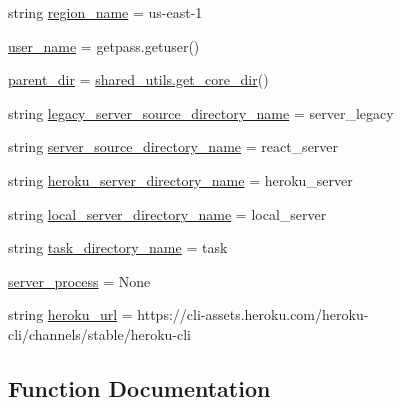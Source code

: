 \begin{DoxyCompactItemize}
\item 
string \hyperlink{namespaceparlai_1_1mturk_1_1core_1_1server__utils_a3148ed1b9fc26d850b7727c329ea1b73}{region\+\_\+name} = \textquotesingle{}us-\/east-\/1\textquotesingle{}
\item 
\hyperlink{namespaceparlai_1_1mturk_1_1core_1_1server__utils_aab8bab9c0a550608566b493173c8fd28}{user\+\_\+name} = getpass.\+getuser()
\item 
\hyperlink{namespaceparlai_1_1mturk_1_1core_1_1server__utils_a193439bdbc25a32b00f1a43e6f8532d8}{parent\+\_\+dir} = \hyperlink{namespaceparlai_1_1mturk_1_1core_1_1shared__utils_ac4e340ccc66c691fdd294c734dae0c5d}{shared\+\_\+utils.\+get\+\_\+core\+\_\+dir}()
\item 
string \hyperlink{namespaceparlai_1_1mturk_1_1core_1_1server__utils_aaa35bdfa37d926080bd65c861ff2b33d}{legacy\+\_\+server\+\_\+source\+\_\+directory\+\_\+name} = \textquotesingle{}server\+\_\+legacy\textquotesingle{}
\item 
string \hyperlink{namespaceparlai_1_1mturk_1_1core_1_1server__utils_a8142bfb84ba54bd691b970ee7e23ebfd}{server\+\_\+source\+\_\+directory\+\_\+name} = \textquotesingle{}react\+\_\+server\textquotesingle{}
\item 
string \hyperlink{namespaceparlai_1_1mturk_1_1core_1_1server__utils_a8cb98cb11ecd7bf3367ee1bc905816d6}{heroku\+\_\+server\+\_\+directory\+\_\+name} = \textquotesingle{}heroku\+\_\+server\textquotesingle{}
\item 
string \hyperlink{namespaceparlai_1_1mturk_1_1core_1_1server__utils_a92c5f0a1f865d92529a068b42fe34137}{local\+\_\+server\+\_\+directory\+\_\+name} = \textquotesingle{}local\+\_\+server\textquotesingle{}
\item 
string \hyperlink{namespaceparlai_1_1mturk_1_1core_1_1server__utils_af84647abb3c9095dc9329ac04f152932}{task\+\_\+directory\+\_\+name} = \textquotesingle{}task\textquotesingle{}
\item 
\hyperlink{namespaceparlai_1_1mturk_1_1core_1_1server__utils_a78acb12c579488b178c9815ce79f4018}{server\+\_\+process} = None
\item 
string \hyperlink{namespaceparlai_1_1mturk_1_1core_1_1server__utils_a0be0b7cf4282e18d1db21267bfe1e5d9}{heroku\+\_\+url} = \textquotesingle{}https\+://cli-\/assets.\+heroku.\+com/heroku-\/cli/channels/stable/heroku-\/cli\textquotesingle{}
\end{DoxyCompactItemize}


\subsection{Function Documentation}
\mbox{\label{namespaceparlai_1_1mturk_1_1core_1_1server__utils_a8dfde882f9d6ff492ca565ae2334fc70}} 

